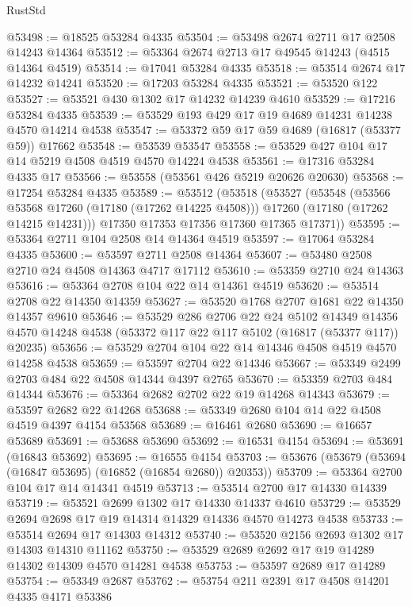 \begin{lexlean}{RustStd}
\begin{coremodule}
{\begin{coremodule}
{{{{{{{{{{{{{{{{{{{{{{{{{{{{{{{{{{{{{{{{{{{{{{{{{{{{{{{@53498 := @18525 @53284 @4335
@53504 := @53498 @2674 @2711 @17 @2508 @14243 @14364
@53512 := @53364 @2674 @2713 @17 @49545 @14243 (@4515 @14364 @4519)
@53514 := @17041 @53284 @4335
@53518 := @53514 @2674 @17 @14232 @14241
@53520 := @17203 @53284 @4335
@53521 := @53520 @122
@53527 := @53521 @430 @1302 @17 @14232 @14239 @4610
@53529 := @17216 @53284 @4335
@53539 := @53529 @193 @429 @17 @19 @4689 @14231 @14238 @4570 @14214 @4538
@53547 := @53372 @59 @17 @59 @4689 (@16817 (@53377 @59)) @17662
@53548 := @53539 @53547
@53558 := @53529 @427 @104 @17 @14 @5219 @4508 @4519 @4570 @14224 @4538
@53561 := @17316 @53284 @4335 @17
@53566 := @53558 (@53561 @426 @5219 @20626 @20630)
@53568 := @17254 @53284 @4335
@53589 := @53512
    (@53518
      (@53527
        (@53548
          (@53566 @53568 @17260 (@17180 (@17262 @14225 @4508)))
          @17260
          (@17180 (@17262 @14215 @14231)))
        @17350
        @17353
        @17356
        @17360
        @17365
        @17371))
@53595 := @53364 @2711 @104 @2508 @14 @14364 @4519
@53597 := @17064 @53284 @4335
@53600 := @53597 @2711 @2508 @14364
@53607 := @53480 @2508 @2710 @24 @4508 @14363 @4717 @17112
@53610 := @53359 @2710 @24 @14363
@53616 := @53364 @2708 @104 @22 @14 @14361 @4519
@53620 := @53514 @2708 @22 @14350 @14359
@53627 := @53520 @1768 @2707 @1681 @22 @14350 @14357 @9610
@53646 := @53529
    @286
    @2706
    @22
    @24
    @5102
    @14349
    @14356
    @4570
    @14248
    @4538
    (@53372 @117 @22 @117 @5102 (@16817 (@53377 @117)) @20235)
@53656 := @53529 @2704 @104 @22 @14 @14346 @4508 @4519 @4570 @14258 @4538
@53659 := @53597 @2704 @22 @14346
@53667 := @53349 @2499 @2703 @484 @22 @4508 @14344 @4397 @2765
@53670 := @53359 @2703 @484 @14344
@53676 := @53364 @2682 @2702 @22 @19 @14268 @14343
@53679 := @53597 @2682 @22 @14268
@53688 := @53349 @2680 @104 @14 @22 @4508 @4519 @4397 @4154 @53568
@53689 := @16461 @2680
@53690 := @16657 @53689
@53691 := @53688 @53690
@53692 := @16531 @4154
@53694 := @53691 (@16843 @53692)
@53695 := @16555 @4154
@53703 := @53676 (@53679 (@53694 (@16847 @53695) (@16852 (@16854 @2680)) @20353))
@53709 := @53364 @2700 @104 @17 @14 @14341 @4519
@53713 := @53514 @2700 @17 @14330 @14339
@53719 := @53521 @2699 @1302 @17 @14330 @14337 @4610
@53729 := @53529 @2694 @2698 @17 @19 @14314 @14329 @14336 @4570 @14273 @4538
@53733 := @53514 @2694 @17 @14303 @14312
@53740 := @53520 @2156 @2693 @1302 @17 @14303 @14310 @11162
@53750 := @53529 @2689 @2692 @17 @19 @14289 @14302 @14309 @4570 @14281 @4538
@53753 := @53597 @2689 @17 @14289
@53754 := @53349 @2687
@53762 := @53754 @211 @2391 @17 @4508 @14201 @4335 @4171 @53386
}}}}}}}}}}}}}}}}}}}}}}}}}}}}}}}}}}}}}}}}}}}}}}}}}}}}}}}
\end{coremodule}}
\end{coremodule}
\end{lexlean}
